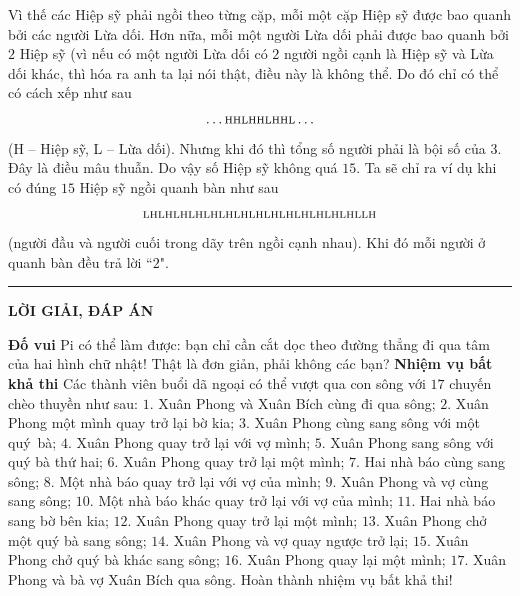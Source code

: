 \begin{multicols}{2}
	\vskip 0.1cm 
	Vì thế các Hiệp sỹ phải ngồi theo từng cặp, mỗi một cặp Hiệp sỹ được bao quanh bởi các người Lừa dối. Hơn nữa, mỗi một người Lừa dối phải được bao quanh bởi $2$ Hiệp sỹ (vì nếu có một người Lừa dối có $2$ người ngồi cạnh là Hiệp sỹ và Lừa dối khác, thì hóa ra anh ta lại nói thật, điều này là không thể. Do đó chỉ có thể có cách xếp như sau
	\begin{align*}
		\ldots\text{\scriptsize{HHLHHLHHL}}\ldots
	\end{align*}
	(H -- Hiệp sỹ, L -- Lừa dối). Nhưng khi đó thì tổng số người phải là bội số của $3$. Đây là điều mâu thuẫn. Do vậy số Hiệp sỹ không quá $15$.
	\vskip 0.1cm
	Ta sẽ chỉ ra ví dụ khi có đúng $15$ Hiệp sỹ ngồi quanh bàn như sau
	\begin{align*}
		\text{\scriptsize{LHLHLHLHLHLHLHLHLHLHLHLHLHLHLLH}}
	\end{align*}
	(người đầu và người cuối trong dãy trên ngồi cạnh nhau). Khi đó mỗi người ở quanh bàn đều trả lời ``$2$".
\end{multicols}
\vspace*{-10pt}
\rule{1\linewidth}{0.1pt}
\begin{center}
	\textbf{\LARGE\color{toancuabi}LỜI GIẢI, ĐÁP ÁN}
\end{center}
\begin{multicols}{2}
	\textbf{\color{toancuabi}Đố vui}
	\vskip 0.1cm
	Pi có thể làm được: bạn chỉ cần cắt dọc theo đường thẳng đi qua tâm của hai
	hình chữ nhật! Thật là đơn giản, phải không các bạn?
	\vskip 0.1cm
	\textbf{\color{toancuabi}Nhiệm vụ bất khả thi}
	\vskip 0.1cm
	Các thành viên buổi dã ngoại có thể vượt qua con sông với $17$ chuyến chèo thuyền như sau:
	\vskip 0.1cm
	$1.$ Xuân Phong và Xuân Bích cùng đi qua sông;
	\vskip 0.1cm
	$2.$ Xuân Phong một mình quay trở lại bờ kia;
	\vskip 0.1cm
	$3.$ Xuân Phong cùng sang sông với một quý~bà;
	\vskip 0.1cm
	$4.$ Xuân Phong quay trở lại với vợ mình;
	\vskip 0.1cm
	$5.$ Xuân Phong sang sông với quý bà thứ hai;
	\vskip 0.1cm
	$6.$ Xuân Phong quay trở lại một mình;
	\vskip 0.1cm
	$7.$ Hai nhà báo cùng sang sông;
	\vskip 0.1cm
	$8.$ Một nhà báo quay trở lại với vợ của mình;
	\vskip 0.1cm
	$9.$ Xuân Phong và vợ cùng sang sông;
	\vskip 0.1cm
	$10.$ Một nhà báo khác quay trở lại với vợ của mình;
	\vskip 0.1cm
	$11.$ Hai nhà báo sang bờ bên kia;
	\vskip 0.1cm
	$12.$ Xuân Phong quay trở lại một mình;
	\vskip 0.1cm
	$13.$ Xuân Phong chở một quý bà sang sông;
	\vskip 0.1cm
	$14.$ Xuân Phong và vợ quay ngược trở lại;
	\vskip 0.1cm
	$15.$ Xuân Phong chở quý bà khác sang sông;
	\vskip 0.1cm
	$16.$ Xuân Phong quay lại một mình;
	\vskip 0.1cm
	$17.$ Xuân Phong và bà vợ Xuân Bích qua sông.
	\vskip 0.1cm
	Hoàn thành nhiệm vụ bất khả thi!
\end{multicols}

